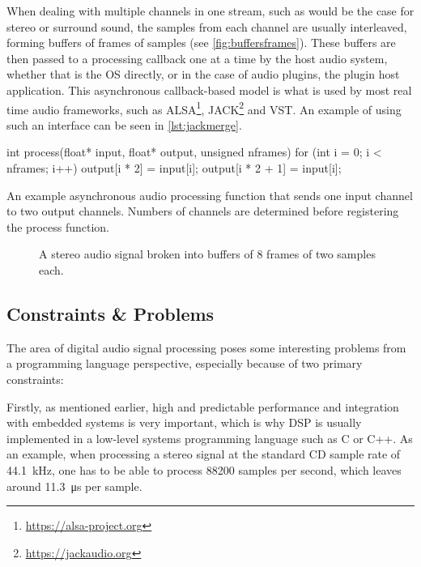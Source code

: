 When dealing with multiple channels in one stream, such as would be the case for stereo or surround sound,
the samples from each channel are usually interleaved, forming buffers of frames of samples (see
\autoref{fig:buffersframes}). These buffers are then passed to a processing callback one at a time by the host
audio system, whether that is the OS directly, or in the case of audio plugins, the plugin host application.
This asynchronous callback-based model is what is used by most real time audio frameworks, such as
ALSA\footnote{\url{https://alsa-project.org}}, JACK\footnote{\url{https://jackaudio.org}} and VST. An example of using such an interface can be
seen in \autoref{lst:jackmerge}.

\begin{listing}
  \begin{cppcodenl}
  int process(float* input, float* output, unsigned nframes) {
    for (int i = 0; i < nframes; i++) {
      output[i * 2] = input[i];
      output[i * 2 + 1] = input[i];
    }
  }
  \end{cppcodenl}
  \label{lst:jackmerge}
  \caption{An example asynchronous audio processing function that sends one input channel to two output channels.
    Numbers of channels are determined before registering the process function.
  }
\end{listing}

\begin{figure}
  
  \caption{A stereo audio signal broken into buffers of 8 frames of two samples each.}
  \label{fig:buffersframes}
\end{figure}

\subsection{Constraints \& Problems}

The area of digital audio signal processing poses some interesting problems from a programming language
perspective, especially because of two primary constraints:

Firstly, as mentioned earlier, high and predictable performance and integration with embedded systems is very
important, which is why DSP is usually implemented in a low-level systems programming language such as C or
C++. As an example, when processing a stereo signal at the standard CD sample rate of \SI{44.1}{kHz},
one has to be able to process \num{88200} samples per second, which leaves around
\SI{11.3}{\micro\second} per sample.

